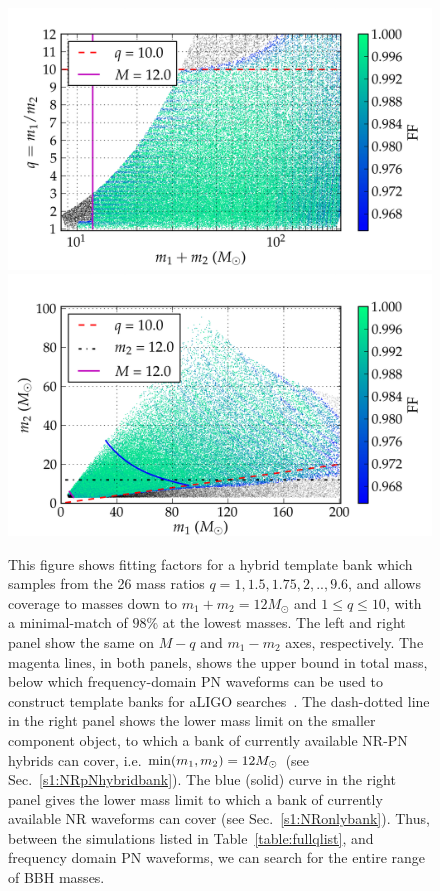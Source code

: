 \begin{figure}
\begin{center}
\includegraphics[width=\columnwidth]{figures/nrhybbank/bank_seperate_q1-4-35-4-65-9-6_01_mtot200_match-tiny.png}
\includegraphics[width=\columnwidth]{figures/nrhybbank/bank_seperate_q1-4-35-4-65-9-6_01_m1m2200_match-tiny.png}
\caption{\label{fig:templatebank_halfMassRatios}This figure shows
  fitting factors for a hybrid template bank which samples from the 26 mass
  ratios $q=1,1.5,1.75,2,..,9.6$, and allows coverage to masses down to 
  $m_1 + m_2 = 12M_{\odot}$ and $1\leq q\leq 10$, with a minimal-match of $98\%$
  at the lowest masses. 
  The left and right panel show the same on $M-q$ and $m_1-m_2$ axes, 
  respectively. The magenta lines, in both panels, shows the upper bound 
  in total mass, below which frequency-domain PN waveforms can be used to construct template banks for aLIGO
  searches~\cite{CompTemplates2009,Brown:2012nn}. The dash-dotted line
  in the right panel shows the lower mass limit on the smaller component object,
  to which a bank of currently available NR-PN hybrids can cover, i.e.
  $\mathrm{min}(m_1,m_2)=12M_\odot$ (see Sec.~\ref{s1:NRpNhybridbank}). The blue (solid)
  curve in  the right panel gives the lower mass limit to which a bank of
  currently available NR waveforms can cover (see Sec.~\ref{s1:NRonlybank}).
  Thus, between the simulations listed in Table~\ref{table:fullqlist}, 
  and frequency domain PN waveforms, we can search for the entire range of 
  BBH masses.}
\end{center}
\end{figure}
